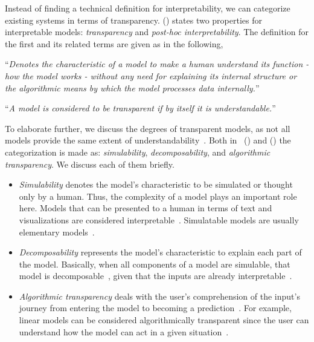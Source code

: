 Instead of finding a technical definition for interpretability, we can categorize existing systems in terms of transparency.
\citeauthor{TheMythosOfModelInterpretability_Lipton} (\citeyear{TheMythosOfModelInterpretability_Lipton}) states two properties for interpretable models: \emph{transparency} and \emph{post-hoc interpretability}. The definition for the first and its related terms are given as in the following,
\begin{definition}
    “\emph{Denotes the characteristic of a model to make a human understand its function - how the model works - without any need for explaining its internal structure or the algorithmic means by which the model processes data internally.}”~\parencite{MethodsForInterpretingAndUnderstandingDNNs_Montavon,XAIConceptsTaxonomies_Arrieta}
\end{definition}
\begin{definition}
    “\emph{A model is considered to be transparent if by itself it is understandable.}”~\parencite{XAIConceptsTaxonomies_Arrieta}
\end{definition}
To elaborate further, we discuss the degrees of transparent models, as not all models provide the same extent of understandability~\parencite{XAIConceptsTaxonomies_Arrieta}. Both in~\citeauthor{TheMythosOfModelInterpretability_Lipton} (\citeyear{TheMythosOfModelInterpretability_Lipton}) and \citeauthor{XAIConceptsTaxonomies_Arrieta} (\citeyear{XAIConceptsTaxonomies_Arrieta}) the categorization is made as: \emph{simulability}, \emph{decomposability}, and \emph{algorithmic transparency}. We discuss each of them briefly.
\begin{itemize}
    \item \emph{Simulability} denotes the model’s characteristic to be simulated or thought only by a human. Thus, the complexity of a model plays an important role here. Models that can be presented to a human in terms of text and visualizations are considered interpretable~\parencite{WhyShouldITrustYou_Riberio}. Simulatable models are usually elementary models~\parencite{XAIConceptsTaxonomies_Arrieta, RegressionShrinkage_Tibshirani}.
    \item \emph{Decomposability} represents the model’s characteristic to explain each part of the model. Basically, when all components of a model are simulable, that model is decomposable~\parencite{TheMythosOfModelInterpretability_Lipton}, given that the inputs are already interpretable~\parencite{XAIConceptsTaxonomies_Arrieta}.
    \item \emph{Algorithmic transparency} deals with the user’s comprehension of the input’s journey from entering the model to becoming a prediction~\parencite{TheMythosOfModelInterpretability_Lipton, XAIConceptsTaxonomies_Arrieta}. For example, linear models can be considered algorithmically transparent since the user can understand how the model can act in a given situation~\parencite{AnIntroductionToStatisticalLearning_Gareth}.
\end{itemize}
